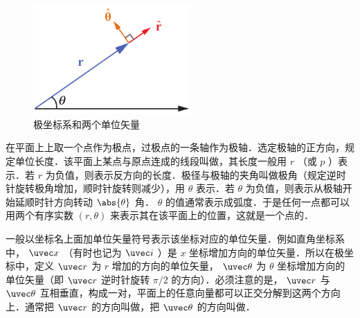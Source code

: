 
\begin{figure}[ht]
\centering
\includegraphics[width=6cm]{./figures/Polar.pdf}
\caption{极坐标系和两个单位矢量}
\end{figure}

在平面上上取一个点作为极点，过极点的一条轴作为极轴．选定极轴的正方向，规定单位长度．该平面上某点与原点连成的线段叫做，其长度一般用 $r$ （或 $p$ ）表示．若 $r$ 为负值，则表示反方向的长度．极径与极轴的夹角叫做极角（规定逆时针旋转极角增加，顺时针旋转则减少），用 $\theta $ 表示．若 $\theta $ 为负值，则表示从极轴开始延顺时针方向转动 $\abs{\theta}$ 角． $\theta $ 的值通常表示成弧度．于是任何一点都可以用两个有序实数 $(r,\theta)$ 来表示其在该平面上的位置，这就是一个点的．

一般以坐标名上面加单位矢量符号表示该坐标对应的单位矢量．例如直角坐标系中， $\uvec x$ （有时也记为 $\uvec i$ ）是 $x$ 坐标增加方向的单位矢量．所以在极坐标中，定义 $\uvec r$ 为 $r$ 增加的方向的单位矢量， $\uvec \theta $ 为 $\theta $ 坐标增加方向的单位矢量（即 $\uvec r$ 逆时针旋转 $\pi/2$ 的方向）．必须注意的是， $\uvec r$ 与 $\uvec \theta$ 互相垂直，构成一对，平面上的任意向量都可以正交分解到这两个方向上．通常把 $\uvec r$ 的方向叫做，把 $\uvec \theta $ 的方向叫做．

